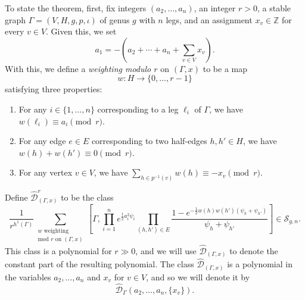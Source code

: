 \documentclass[12pt,reqno]{amsart}
\theoremstyle{plain}
\newtheorem{proposition}[theorem]{Proposition}
\theoremstyle{definition}
\theoremstyle{remark}
\begin{document}
To state the theorem, first, fix integers $(a_2, \dotsc, a_n)$, an integer $r > 0$, a
stable graph $\Gamma=(V,H,g,p,\iota)$ of genus $g$ with $n$ legs, and an  assignment $x_v \in \mathbb Z$ for
every $v \in V$.
Given this, we set
\begin{equation*}
  a_1 = -(a_2 + \dotsb + a_n + \sum_{v \in V} x_v).
\end{equation*}
With this, we define a \emph{weighting modulo $r$} on $(\Gamma, x)$ to be a
map
\begin{equation*}
  w\colon H \to \{0, \dotsc, r - 1\}
\end{equation*}
satisfying three properties:
\begin{enumerate}
\item For any $i \in \{1, \dotsc, n\}$ corresponding to a leg $\ell_i$
  of $\Gamma$, we have $w(\ell_i) \equiv a_i \pmod{r}$.
\item For any edge $e\in E$ corresponding to two half-edges $h, h'\in H$, we
  have $w(h) + w(h') \equiv 0 \pmod{r}$.
\item For any vertex $v \in V$, we have
  $\sum_{h\in p^{-1}(v)} w(h) \equiv -x_v \pmod{r}$.
\end{enumerate}
Define $\widehat{\mathcal{D}}_{(\Gamma,x)}^r$ to be the class
\begin{equation*}
  \frac 1{r^{h^1(\Gamma)}} \sum_{\substack{w \text{ weighting }\\ \text{mod } r \text{ on }(\Gamma,x)}} \left[\Gamma, \prod_{i=1}^n e^{\frac 12 a_i^2\psi_i} \prod_{(h,h')\in E} \frac{1 - e^{-\frac 12 w(h)w(h')(\psi_h + \psi_{h'})}}{\psi_h + \psi_{h'}}\right] \in \mathcal{S}_{g,n}.
\end{equation*}
This class is a polynomial for $r \gg 0$, and we will use
$\widehat{\mathcal{D}}_{(\Gamma,x)}$ to denote the constant part of the resulting
polynomial.
The class $\widehat{\mathcal{D}}_{(\Gamma,x)}$ is a polynomial in the variables
$a_2, \dotsc, a_n$ and $x_v$ for $v \in V$, and so we will
denote it by
\begin{equation*}
\widehat{\mathcal{D}}_{\Gamma}(a_2, \dotsc, a_n, \{x_v\}).
\end{equation*}

  
\end{document}
